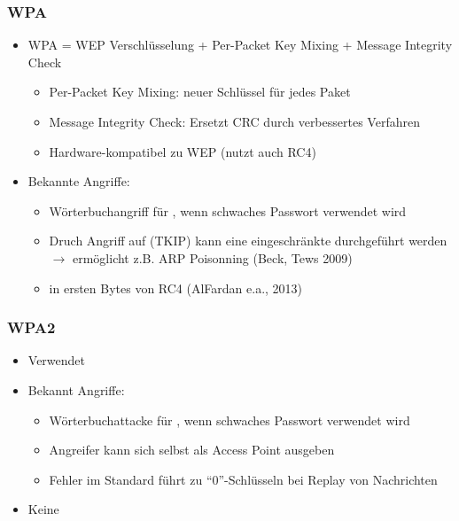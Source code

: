 \subsubsection*{WPA}
\begin{itemize}
    \item WPA = WEP Verschlüsselung + Per-Packet Key Mixing + Message Integrity Check
    \begin{itemize}
        \item Per-Packet Key Mixing: neuer Schlüssel für jedes Paket
        \item Message Integrity Check: Ersetzt CRC durch verbessertes Verfahren
        \item Hardware-kompatibel zu WEP (nutzt auch RC4)
    \end{itemize}
    \item Bekannte Angriffe:
    \begin{itemize}
        \item Wörterbuchangriff für , wenn schwaches Passwort verwendet wird
        \item Druch Angriff auf  (TKIP) kann eine eingeschränkte  durchgeführt werden $\rightarrow$ ermöglicht z.B. ARP Poisonning (Beck, Tews 2009)
        \item {} in ersten Bytes von RC4 (AlFardan e.a., 2013)
    \end{itemize}
\end{itemize}
\subsubsection*{WPA2}
\begin{itemize}
    \item Verwendet 
    \item Bekannt Angriffe:
    \begin{itemize}
        \item Wörterbuchattacke für , wenn schwaches Passwort verwendet wird
        \item {} Angreifer kann sich selbst als Access Point ausgeben
        \item {} Fehler im Standard führt zu \enquote{0}-Schlüsseln bei Replay von Nachrichten
    \end{itemize}
    \item Keine 
\end{itemize}
